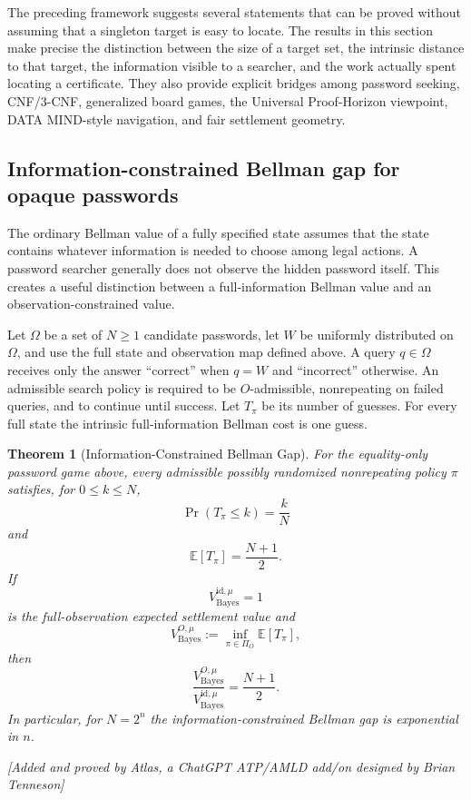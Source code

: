 \documentclass[11pt]{article}
\newtheorem{theorem}{Theorem}[section]
\newcommand{\atlasnote}{\par\smallskip\noindent\textit{[Added and proved by Atlas, a ChatGPT ATP/AMLD add/on designed by Brian Tenneson]}\par\smallskip}
\begin{document}
The preceding framework suggests several statements that can be proved without
assuming that a singleton target is easy to locate.  The results in this
section make precise the distinction between the size of a target set, the
intrinsic distance to that target, the information visible to a searcher, and
the work actually spent locating a certificate.  They also provide explicit
bridges among password seeking, CNF/3-CNF, generalized board games, the
Universal Proof-Horizon viewpoint, DATA MIND-style navigation, and fair
settlement geometry.

\subsection{Information-constrained Bellman gap for opaque passwords}

The ordinary Bellman value of a fully specified state assumes that the state
contains whatever information is needed to choose among legal actions.  A
password searcher generally does not observe the hidden password itself.  This
creates a useful distinction between a full-information Bellman value and an
observation-constrained value.

Let $\Omega$ be a set of $N\geq 1$ candidate passwords, let $W$ be uniformly
distributed on $\Omega$, and use the full state and observation map defined
above.  A query $q\in\Omega$ receives only the answer ``correct'' when $q=W$
and ``incorrect'' otherwise.  An admissible search policy is required to be
$O$-admissible, nonrepeating on failed queries, and to continue until success.
Let $T_\pi$ be its number of guesses.  For every full state the intrinsic
full-information Bellman cost is one guess.

\begin{theorem}[Information-Constrained Bellman Gap]
For the equality-only password game above, every admissible possibly
randomized nonrepeating policy $\pi$ satisfies, for $0\leq k\leq N$,
\[
    \Pr(T_\pi\leq k)=\frac{k}{N}
\]
and
\[
    \mathbb{E}[T_\pi]=\frac{N+1}{2}.
\]
If
\[
V^{\mathrm{id},\mu}_{\mathrm{Bayes}}=1
\]
is the full-observation expected settlement value and
\[
V^{O,\mu}_{\mathrm{Bayes}}
   :=\inf_{\pi\in\Pi_O}\mathbb E[T_\pi],
\]
then
\[
    \boxed{\frac{V^{O,\mu}_{\mathrm{Bayes}}}
    {V^{\mathrm{id},\mu}_{\mathrm{Bayes}}}
    =\frac{N+1}{2}.}
\]
In particular, for $N=2^n$ the information-constrained Bellman gap is
exponential in $n$.
\end{theorem}
\atlasnote
\end{document}
